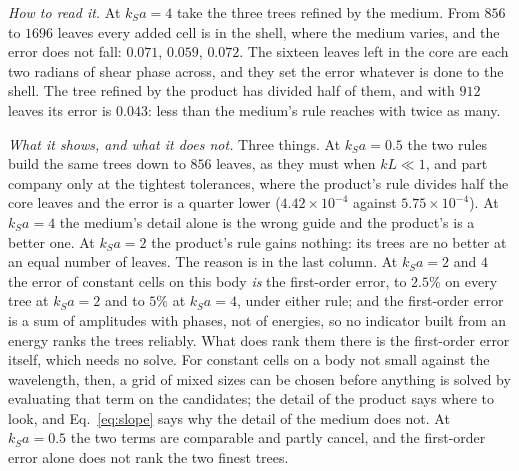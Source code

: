 \documentclass[11pt,a4paper]{article}
\begin{document}
\emph{How to read it.} At $k_Sa=4$ take the three trees refined by the medium. From $856$ to $1696$ leaves
every added cell is in the shell, where the medium varies, and the error does not fall: $0.071$, $0.059$,
$0.072$. The sixteen leaves left in the core are each two radians of shear phase across, and they set the
error whatever is done to the shell. The tree refined by the product has divided half of them, and with
$912$ leaves its error is $0.043$: less than the medium's rule reaches with twice as many.

\emph{What it shows, and what it does not.} Three things. At $k_Sa=0.5$ the two rules build the same
trees down to $856$ leaves, as they must when $kL\ll1$, and part company only at the tightest
tolerances, where the product's rule divides half the core leaves and the error is a quarter lower
($4.42\times10^{-4}$ against $5.75\times10^{-4}$). At $k_Sa=4$ the medium's detail alone is the wrong
guide and the product's is a better one. At $k_Sa=2$ the product's rule gains nothing: its trees are no
better at an equal number of leaves. The reason is in the last column. At $k_Sa=2$ and $4$ the error of
constant cells on this body \emph{is} the first-order error, to $2.5\%$ on every tree at $k_Sa=2$ and to
$5\%$ at $k_Sa=4$, under either rule; and the first-order error is a sum of amplitudes with phases, not
of energies, so no indicator built from an energy ranks the trees reliably. What does rank them there is
the first-order error itself, which needs no solve. For constant cells on a body not small against the
wavelength, then, a grid of mixed sizes can be chosen before anything is solved by evaluating that term
on the candidates; the detail of the product says where to look, and Eq.~\eqref{eq:slope} says why the
detail of the medium does not. At $k_Sa=0.5$ the two terms are comparable and partly cancel, and the
first-order error alone does not rank the two finest trees.
\end{document}
